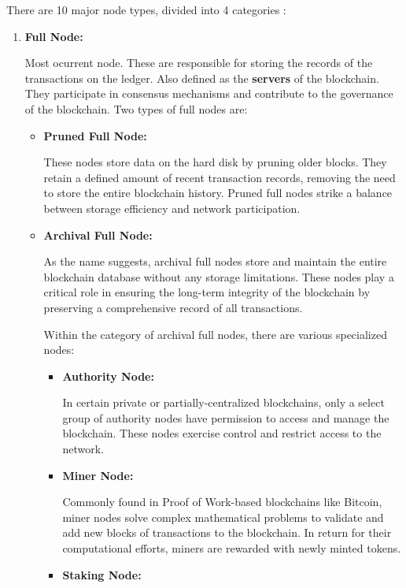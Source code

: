There are 10 major node types, divided into 4 categories \cite{node_type}:

\begin{enumerate}
    \item \textbf{Full Node:}

    Most ocurrent node. These are responsible for storing the records of the transactions on the ledger. Also defined as the \textbf{servers} of the blockchain. They participate in consensus mechanisms and contribute to the governance of the blockchain. Two types of full nodes are:

    \begin{itemize}
            \item \textbf{Pruned Full Node:}

     These nodes store data on the hard disk by pruning older blocks. They retain a defined amount of recent transaction records, removing the need to store the entire blockchain history. Pruned full nodes strike a balance between storage efficiency and network participation.\newline
    
    \item \textbf{Archival Full Node:}

    As the name suggests, archival full nodes store and maintain the entire blockchain database without any storage limitations. These nodes play a critical role in ensuring the long-term integrity of the blockchain by preserving a comprehensive record of all transactions.
    
Within the category of archival full nodes, there are various specialized nodes:\newline

\begin{itemize}
    \item \textbf{Authority Node:}

    In certain private or partially-centralized blockchains, only a select group of authority nodes have permission to access and manage the blockchain. These nodes exercise control and restrict access to the network.\newline
    
    \item \textbf{Miner Node:}

    Commonly found in Proof of Work-based blockchains like Bitcoin, miner nodes solve complex mathematical problems to validate and add new blocks of transactions to the blockchain. In return for their computational efforts, miners are rewarded with newly minted tokens.\newline
    \item \textbf{Staking Node:}


\end{itemize}
\end{itemize}
\end{enumerate}
